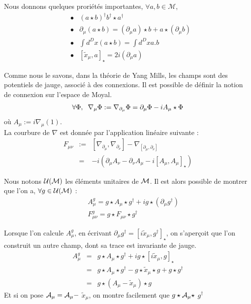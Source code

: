 \documentclass[a4paper,11pt]{article} %
\theoremstyle{plain}
\theoremstyle{definition}
\theoremstyle{remark}
\numberwithin{equation}{section}
\numberwithin{equation}{subsection}
\numberwithin{figure}{section}
\begin{document}
\noindent
Nous donnons quelques proriétés importantes, $\forall a,b \in \mathcal{M}$,
\begin{eqnarray*}
 &\bullet& (a \star b )^{\dagger}  b^{\dagger}  \star  a^{\dagger}  \\
 &\bullet& \partial_{\mu} (a \star b) = (\partial_{\mu}a) \star b  +  a \star  (\partial_{\mu} b) \\
 &\bullet& \int d^{D}x (a\star b) = \int d^{D}x a.b \\
 &\bullet& [ \tilde{x}_{\mu} ,a ]_{\star} = 2i ( \partial_{\mu} a)
\end{eqnarray*}

\noindent
Comme nous le savons, dans la théorie de Yang Mills, les champs sont des potentiels de jauge, associé à des connexions. Il est possible de 
définir la notion de connexion sur l'espace de Moyal.
\begin{eqnarray*}
 \forall \Phi, \hspace{2mm}  \nabla_{\mu} \Phi :=   \nabla_{\partial_{\mu}} \Phi  = \partial_{\mu} \Phi - iA_{\mu} \star  \Phi
\end{eqnarray*}
où  $A_{\mu} := i \nabla_{\mu}(1)$.\\

\noindent
La courbure de $\nabla$ est donnée par l'application linéaire suivante :
\begin{eqnarray*}
 F_{\mu \nu}  &:=&  [ \nabla_{\partial_{\mu}}  , \nabla_{\partial_{\nu}}  ] - \nabla_{[ \partial_{\mu} , \partial_{\nu} ]}   \\
                        &=&  - i ( \partial_{\mu} A_{\nu}  -   \partial_{\nu} A_{\mu}  - i [ A_{\mu} , A_{\mu} ]_{\star}  )
\end{eqnarray*}

\noindent
Nous notons $\cal{U}(\cal{M})$ les éléments unitaires de $\cal{M}$. Il est alors possible de montrer que l'on a, $\forall g \in \cal{U}(\cal{M})$ :
\begin{eqnarray*}
 && A_{\mu}^{g} = g \star A_{\mu} \star g^{\dagger} + ig \star ( \partial_{\mu} g^{\dagger} )  \\
 && F_{\mu \nu }^{g} = g \star F_{\mu \nu}  \star   g^{\dagger}
\end{eqnarray*}

\noindent
Lorsque l'on calcule $A_{\mu}^{g}$, en écrivant $ \partial_{\mu} g^{\dagger}  =  [ i \tilde{x}_{\mu} , g^{\dagger}   ]_{\star}$, on s'aperçoit 
que l'on construit un autre champ, dont sa trace est invariante de jauge.
\begin{eqnarray*}
  A_{\mu}^{g}  &=&  g \star A_{\mu} \star g^{\dagger} + i g \star  [ i \tilde{x}_{\mu} , g ]_{\star}   \\
                         &=&  g \star A_{\mu} \star g^{\dagger} - g \star  \tilde{x}_{\mu} \star  g  + g \star  g^{\dagger}     \\
                         &=&  g \star \left(  A_{\mu} -  \tilde{x}_{\mu} \right) \star  g
\end{eqnarray*}
Et si on pose $\cal{A}_{\mu}  =  A_{\mu} - $ $ \tilde{x}_{\mu}  $, on montre facilement que $g \star \cal{A}_{\mu}  \star$  $g^{\dagger}$
\end{document}
